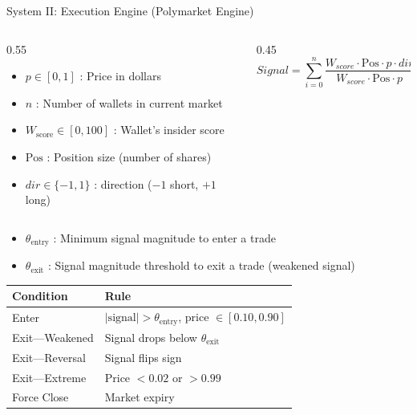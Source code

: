 \documentclass[final]{beamer}
\newlength{\colwidth}
\begin{document}
\begin{frame}[t]
\begin{columns}[t]
\begin{column}{\colwidth}
\begin{block}{System II: Execution Engine (Polymarket Engine)}
    \begin{columns}[t]
      \begin{column}{0.55\linewidth}
        \begin{itemize}
          \setlength{\itemsep}{0pt}\setlength{\parsep}{0pt}
          \item $p \in [0, 1]$ : Price in dollars
          \item $n$ : Number of wallets in current market
          \item $W_{\text{score}} \in [0, 100]$ : Wallet's insider score
          \item $\text{Pos}$ : Position size (number of shares)
          \item $dir \in \{-1, 1\}$ : direction ($-1$ short, $+1$ long)
        \end{itemize}
      \end{column}
      \begin{column}{0.45\linewidth}
        \[ Signal = \sum_{i=0}^n\frac{W_{score}\cdot\text{Pos}\cdot p\cdot dir}{W_{score}\cdot\text{Pos}\cdot p} \]
      \end{column}
    \end{columns}




    \begin{itemize}
      \setlength{\itemsep}{0pt}\setlength{\parsep}{0pt}
      \item $\theta_{\text{entry}}$ : Minimum signal magnitude to enter a trade 
      \item $\theta_{\text{exit}}$ : Signal magnitude threshold to exit a trade (weakened signal)
    \end{itemize}

    \begin{table}
      \centering
      \small
      \begin{tabular}{l l}
        \toprule
        \textbf{Condition} & \textbf{Rule} \\
        \midrule
        Enter & $|\text{signal}| > \theta_{\text{entry}}$, price $\in [0.10, 0.90]$ \\
        Exit---Weakened & Signal drops below $\theta_{\text{exit}}$ \\
        Exit---Reversal & Signal flips sign \\
        Exit---Extreme & Price $< 0.02$ or $> 0.99$ \\
        Force Close & Market expiry \\
        \bottomrule
      \end{tabular}
    \end{table}


\end{block}
\end{column}
\end{columns}
\end{frame}
\end{document}
